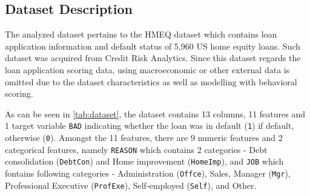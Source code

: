\subsection{Dataset Description}
The analyzed dataset pertains to the HMEQ dataset which contains loan application information and default status of 5,960 US home equity loans. Such dataset was acquired from Credit Risk Analytics. Since this dataset regards the loan application scoring data, using macroeconomic or other external data is omitted due to the dataset characteristics as well as modelling with behavioral scoring.

As can be seen in \autoref{tab:dataset}, the dataset contains 13 columns, 11 features and 1 target variable \texttt{BAD} indicating whether the loan was in default (\texttt{1}) if default, otherwise (\texttt{0}). 
Amongst the 11 features, there are 9 numeric features and 2 categorical features, namely \texttt{REASON} which contains 2 categories - Debt consolidation (\texttt{DebtCon}) and Home improvement (\texttt{HomeImp}), and \texttt{JOB} which fontains following categories - Administration (\texttt{Offce}), Sales, Manager (\texttt{Mgr}), Professional Executive (\texttt{ProfExe}), Self-employed (\texttt{Self}), and Other.


